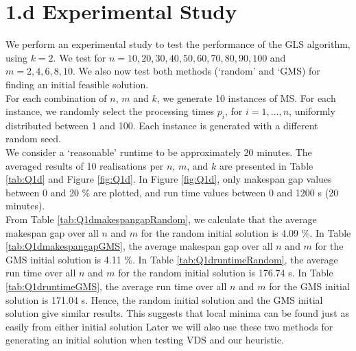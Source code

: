 \documentclass[12pt,a4paper,reqno]{article}
\begin{document}
\section*{1.d Experimental Study}
We perform an experimental study to test the performance of the GLS algorithm, using $k=2$. We test for $n=10,20,30,40,50,60,70,80,90,100$ and $m=2,4,6,8,10$. We also now test both methods (`random' and `GMS) for finding an initial feasible solution. \\

For each combination of $n$, $m$ and $k$, we generate 10 instances of MS. For each instance, we randomly select the processing times $p_i$, for $i=1,...,n$, uniformly distributed between 1 and 100. Each instance is generated with a different random seed. \\

We consider a `reasonable' runtime to be approximately 20 minutes. The averaged results of 10 realisations per $n$, $m$, and $k$ are presented in Table \ref{tab:Q1d} and Figure \ref{fig:Q1d}. In Figure \ref{fig:Q1d}, only makespan gap values between 0 and 20 \% are plotted, and run time values between 0 and 1200 s (20 minutes). \\

From Table \ref{tab:Q1dmakespangapRandom}, we calculate that the average makespan gap over all $n$ and $m$ for the random initial solution is 4.09 \%. In Table \ref{tab:Q1dmakespangapGMS}, the average makespan gap over all $n$ and $m$ for the GMS initial solution is 4.11 \%. In Table \ref{tab:Q1druntimeRandom}, the average run time over all $n$ and $m$ for the random initial solution is 176.74 s. In Table \ref{tab:Q1druntimeGMS}, the average run time over all $n$ and $m$ for the GMS initial solution is 171.04 s. Hence, the random initial solution and the GMS initial solution give similar results. \color{red} This suggests that local minima can be found just as easily from either initial solution \color{black} Later we will also use these two methods for generating an initial solution when testing VDS and our heuristic.
\end{document}
